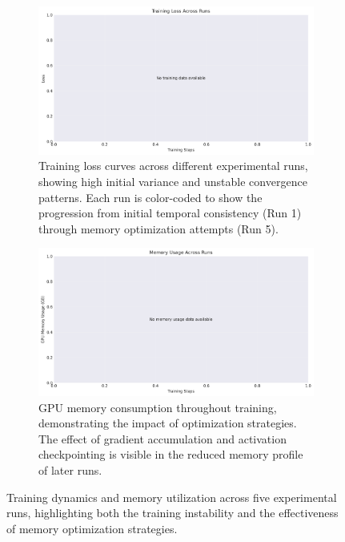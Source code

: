 \documentclass{article} %
\begin{document}
\begin{figure}[h]
    \centering
    \begin{subfigure}{0.48\textwidth}
        \includegraphics[width=\textwidth]{training_loss.png}
        \caption{Training loss curves across different experimental runs, showing high initial variance and unstable convergence patterns. Each run is color-coded to show the progression from initial temporal consistency (Run 1) through memory optimization attempts (Run 5).}
        \label{fig:training-loss}
    \end{subfigure}
    \hfill
    \begin{subfigure}{0.48\textwidth}
        \includegraphics[width=\textwidth]{memory_usage.png}
        \caption{GPU memory consumption throughout training, demonstrating the impact of optimization strategies. The effect of gradient accumulation and activation checkpointing is visible in the reduced memory profile of later runs.}
        \label{fig:memory-usage}
    \end{subfigure}
    \caption{Training dynamics and memory utilization across five experimental runs, highlighting both the training instability and the effectiveness of memory optimization strategies.}
    \label{fig:results}
\end{figure}
\end{document}
